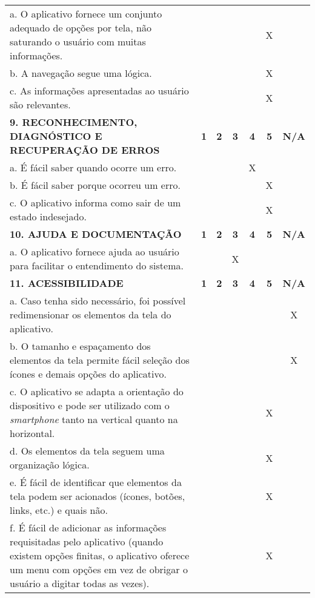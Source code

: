 \documentclass[portuguese,oneside]{tcc}
\begin{document}
\begin{center}
\begin{longtabu}{|L{25em}|c|c|c|c|c|c|}
								a. O aplicativo fornece um conjunto adequado de opções por tela, não saturando o usuário com muitas informações. & & & & & X & \\ 
								b. A navegação segue uma lógica. & & & & & X & \\ 
								c. As informações apresentadas ao usuário são relevantes. & & & & & X & \\ 
								\textbf{9. RECONHECIMENTO, DIAGNÓSTICO E RECUPERAÇÃO DE ERROS} & \textbf{1} & \textbf{2} & \textbf{3} & \textbf{4} & \textbf{5} & \textbf{N/A} \\ 
								a. É fácil saber quando ocorre um erro.	& & & & X & & \\ 
								b. É fácil saber porque ocorreu um erro. & & & & & X & \\ 
								c. O aplicativo informa como sair de um estado indesejado. & & & & & X & \\ 
								\textbf{10. AJUDA E DOCUMENTAÇÃO} & \textbf{1} & \textbf{2} & \textbf{3} & \textbf{4} & \textbf{5} & \textbf{N/A} \\ 
								a. O aplicativo fornece ajuda ao usuário para facilitar o entendimento do sistema. & & & X & & & \\ 
								\textbf{11. ACESSIBILIDADE} & \textbf{1} & \textbf{2} & \textbf{3} & \textbf{4} & \textbf{5} & \textbf{N/A} \\ 
								a. Caso tenha sido necessário, foi possível redimensionar os elementos da tela do aplicativo. & & & & & & X \\ 
								b. O tamanho e espaçamento dos elementos da tela permite fácil seleção dos ícones e demais opções do aplicativo. & & & & & & X \\ 
								c. O aplicativo se adapta a orientação do dispositivo e pode ser utilizado com o \emph{smartphone} tanto na vertical quanto na horizontal. & & & & & X & \\ 
								d. Os elementos da tela seguem uma organização lógica. & & & & & X & \\ 
								e. É fácil de identificar que elementos da tela podem ser acionados (ícones, botões, links, etc.) e quais não. & & & & & X & \\ 
								f. É fácil de adicionar as informações requisitadas pelo aplicativo (quando existem opções finitas, o aplicativo oferece um menu com opções em vez de obrigar o usuário a digitar todas as vezes). & & & & & X & \\ 

\end{longtabu}
\end{center}
\end{document}
